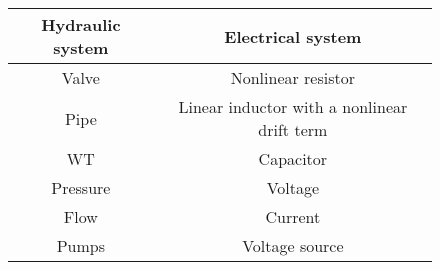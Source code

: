 \begin{figure}[H]
	\centering
\begin{tabular}{c|c} 
  			\bfseries Hydraulic system    &     \bfseries Electrical system  \\ \hline
			Valve		  	  &     Nonlinear resistor   \\ 
			Pipe              &     Linear inductor with a nonlinear drift term       \\ 
			WT 		          &     Capacitor       \\
			Pressure	 	  &     Voltage    \\
			Flow 		      &     Current       \\  
			Pumps 		      &     Voltage source           
\end{tabular}
		\label{tab:hydraulic_electrical}

\end{figure}	


	